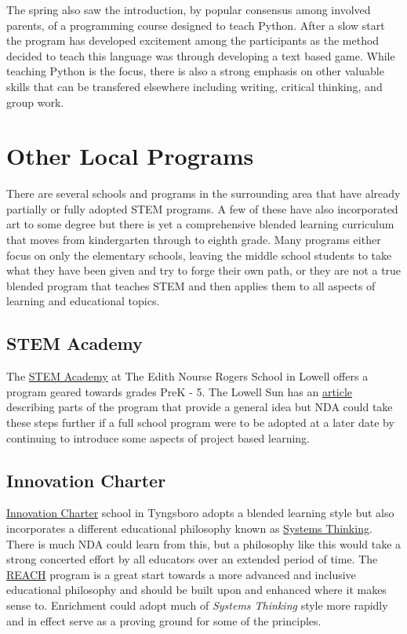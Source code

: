 \documentclass{article}
\begin{document}
The spring also saw the introduction, by popular consensus among involved parents, of a programming course designed to teach Python. After a slow start the program has developed excitement among the participants as the method decided to teach this language was through developing a text based game. While teaching Python is the focus, there is also a strong emphasis on other valuable skills that can be transfered elsewhere including writing, critical thinking, and group work.

\section*{Other Local Programs}

There are several schools and programs in the surrounding area that have already partially or fully adopted STEM programs. A few of these have also incorporated art to some degree but there is yet a comprehensive blended learning curriculum that moves from kindergarten through to eighth grade. Many programs either focus on only the elementary schools, leaving the middle school students to take what they have been given and try to forge their own path, or they are not a true blended program that teaches STEM and then applies them to all aspects of learning and educational topics.

\subsection*{STEM Academy}
The \href{http://stem.lowell.k12.ma.us/pages/EN_Rogers}{STEM Academy} at The Edith Nourse Rogers School in Lowell offers a program geared towards grades PreK - 5. The Lowell Sun has an \href{http://www.lowellsun.com/todaysheadlines/ci_26622390/lowell-youngsters-embracing-stem}{article} describing parts of the program that provide a general idea but NDA could take these steps further if a full school program were to be adopted at a later date by continuing to introduce some aspects of project based learning.

\subsection*{Innovation Charter}
\href{http://www.innovationcharter.org/}{Innovation Charter} school in Tyngsboro adopts a blended learning style but also incorporates a different educational philosophy known as \href{http://www.innovationcharter.org/about-iacs/systems-thinking/}{Systems Thinking}. There is much NDA could learn from this, but a philosophy like this would take a strong concerted effort by all educators over an extended period of time. The \href{http://www.ndatyngsboro.org/lower/reach}{REACH} program is a great start towards a more advanced and inclusive educational philosophy and should be built upon and enhanced where it makes sense to. Enrichment could adopt much of \textit{Systems Thinking} style more rapidly and in effect serve as a proving ground for some of the principles.
\end{document}
